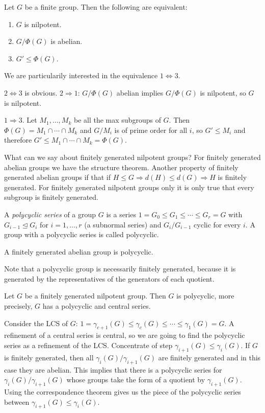 \documentclass[twoside, 11pt]{article}
\begin{document}
\begin{coro}
Let $G$ be a finite group. Then the following are equivalent:
\begin{enumerate}
\item $G$ is nilpotent.
\item $G/\Phi(G)$ is abelian.
\item $G'\leq \Phi(G)$.
\end{enumerate}
\end{coro}
We are particularily interested in the equivalence $1\Leftrightarrow 3$. 
\begin{dem}
$2\Leftrightarrow 3$ is obvious. $2\Rightarrow 1$: $G/\Phi(G)$ abelian implies $G/\Phi(G)$ is nilpotent, so $G$ is nilpotent.

$1\Rightarrow 3$. Let $M_1,\dots, M_k$ be all the max subgroups of $G$. Then $\Phi(G)=M_1\cap\cdots\cap M_k$ and $G/M_i$ is of prime order for all $i$, so $G'\leq M_i$ and therefore $G'\leq M_1\cap\cdots\cap M_k=\Phi(G)$. 
\end{dem}

What can we say about finitely generated nilpotent groups? For finitely generated abelian groups we have the structure theorem. Another property of finitely generated abelian groups if that if $H\leq G\Rightarrow d(H)\leq d(G)\Rightarrow H$ is finitely generated. For finitely generated nilpotent groups only it is only true that every subgroup is finitely generated.


\begin{defi}
A \emph{polycyclic series} of a group $G$ is a series $1=G_0\leq G_1\leq\cdots\leq G_r=G$ with $G_{i-1}\trianglelefteq G_i$ for $i=1,\dots, r$ (a subnormal series) and $G_i/G_{i-1}$ cyclic for every $i$. A group with a polycyclic series is called polycyclic.  
\end{defi}

\begin{ej}
A finitely generated abelian group is polycyclic.
\end{ej}

Note that a polycyclic group is necessarily finitely generated, because it is generated by the representatives of the generators of each quotient. 

\begin{teorema}
Let $G$ be a finitely generated nilpotent group. Then $G$ is polycyclic, more precisely, $G$ has a polycyclic and central series. 
\end{teorema}
\begin{dem}
Consider the LCS of $G$: $1=\gamma_{c+1}(G)\leq \gamma_c(G)\leq\cdots\leq\gamma_1(G)=G$. A refinement of a central series is central, so we are going to find the polycyclic series as a refinement of the LCS. Concentrate of step $\gamma_{i+1}(G)\leq\gamma_i(G)$. If $G$ is finitely generated, then all $\gamma_i(G)/\gamma_{i+1}(G)$ are finitely generated and in this case they are abelian. This implies that there is a polycyclic series for $\gamma_i(G)/\gamma_{i+1}(G)$ whose groups take the form of a quotient by $\gamma_{i+1}(G)$. Using the correspondence theorem gives us the piece of the polycyclic series between $\gamma_{i+1}(G)\leq\gamma_i(G)$. 
\end{dem}
\end{document}
